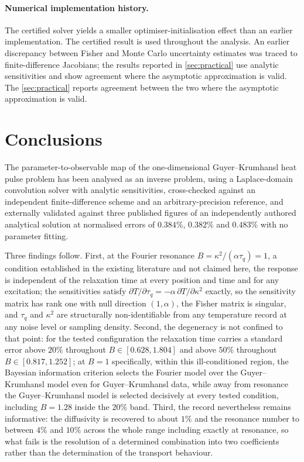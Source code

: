 \documentclass[preprint,12pt,a4paper]{elsarticle}
\theoremstyle{plain}
\theoremstyle{definition}
\theoremstyle{remark}
\newcommand{\tq}{\tau_{q}}
\newcommand{\kk}{\kappa^{2}}
\newcommand{\Bnum}{B}
\begin{document}
\paragraph{Numerical implementation history.}
The certified solver yields a smaller optimiser-initialisation effect than an
earlier implementation. The certified result is used throughout the analysis.
An earlier discrepancy between Fisher and Monte Carlo uncertainty estimates
was traced to finite-difference Jacobians; the results reported in
\cref{sec:practical} use analytic sensitivities and show agreement where the
asymptotic approximation is valid. The \cref{sec:practical} reports agreement between the two
where the asymptotic approximation is valid.

\section{Conclusions}
\label{sec:conclusions}

The parameter-to-observable map of the one-dimensional Guyer--Krumhansl heat
pulse problem has been analysed as an inverse problem, using a Laplace-domain
convolution solver with analytic sensitivities, cross-checked against an
independent finite-difference scheme and an arbitrary-precision reference, and
externally validated against three published figures of an independently
authored analytical solution at normalised errors of $0.384\%$, $0.382\%$ and
$0.483\%$ with no parameter fitting.

Three findings follow. First, at the Fourier resonance
$\Bnum = \kk/(\alpha\tq) = 1$, a condition established in the existing
literature and not claimed here, the response is independent of the relaxation
time at every position and time and for any excitation; the sensitivities
satisfy $\partial T/\partial \tq = -\alpha\,\partial T/\partial \kk$ exactly, so
the sensitivity matrix has rank one with null direction $(1,\alpha)$, the Fisher
matrix is singular, and $\tq$ and $\kk$ are structurally non-identifiable from
any temperature record at any noise level or sampling density. Second, the
degeneracy is not confined to that point: for the tested configuration the
relaxation time carries a standard error above $20\%$ throughout
$\Bnum \in [0.628, 1.804]$ and above $50\%$ throughout
$\Bnum \in [0.817, 1.252]$; at $\Bnum=1$ specifically, within this
ill-conditioned region, the Bayesian information
criterion selects the Fourier model over the Guyer--Krumhansl model even for
Guyer--Krumhansl data, while away from resonance the Guyer--Krumhansl model is
selected decisively at every tested condition, including $\Bnum=1.28$ inside
the $20\%$ band. Third, the record nevertheless remains informative: the
diffusivity is recovered to about $1\%$ and the resonance number to between
$4\%$ and $10\%$ across the whole range including exactly at resonance, so what
fails is the resolution of a determined combination into two coefficients rather
than the determination of the transport behaviour.
\end{document}
